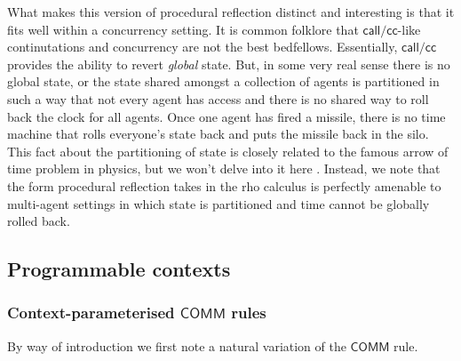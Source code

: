 

What makes this version of procedural reflection distinct and
interesting is that it fits well within a concurrency setting. It is
common folklore that $\mathsf{call/cc}$-like continutations and
concurrency are not the best bedfellows. Essentially,
$\mathsf{call/cc}$ provides the ability to revert \emph{global}
state. But, in some very real sense there is no global state, or the
state shared amongst a collection of agents is partitioned in such a
way that not every agent has access and there is no shared way to roll
back the clock for all agents. Once one agent has fired a missile,
there is no time machine that rolls everyone's state back and puts the
missile back in the silo. This fact about the partitioning of state is
closely related to the famous arrow of time problem in physics, but we
won't delve into it here \cite{enwiki:1234510214}. Instead, we note
that the form procedural reflection takes in the rho calculus is
perfectly amenable to multi-agent settings in which state is
partitioned and time cannot be globally rolled back.

\subsection{Programmable contexts}
\subsubsection{Context-parameterised $\mathsf{COMM}$ rules}
By way of introduction we first note a natural variation of the $\mathsf{COMM}$ rule.

